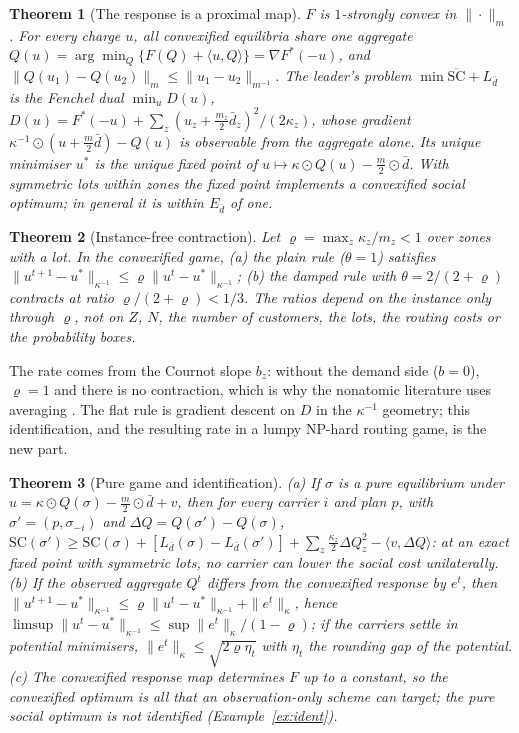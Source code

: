 \documentclass[preprint,11pt]{elsarticle}
\newtheorem{theorem}{Theorem}
\theoremstyle{definition}
\theoremstyle{remark}
\newcommand{\ip}[2]{\langle #1,#2\rangle}
\begin{document}
\begin{theorem}[The response is a proximal map]\label{thm:resolvent}
$F$ is $1$-strongly convex in $\|\cdot\|_m$. For every charge $u$, all convexified equilibria share one aggregate $Q(u)=\arg\min_Q\{F(Q)+\ip uQ\}=\nabla F^*(-u)$, and $\|Q(u_1)-Q(u_2)\|_m\le\|u_1-u_2\|_{m^{-1}}$. The leader's problem $\min\overline{\mathrm{SC}}+L_{\bar d}$ is the Fenchel dual $\min_uD(u)$, $D(u)=F^*(-u)+\sum_z(u_z+\tfrac{m_z}{2}\bar d_z)^2/(2\kappa_z)$, whose gradient $\kappa^{-1}\odot(u+\tfrac m2\bar d)-Q(u)$ is observable from the aggregate alone. Its unique minimiser $u^*$ is the unique fixed point of $u\mapsto\kappa\odot Q(u)-\tfrac m2\odot\bar d$. With symmetric lots within zones the fixed point implements a convexified social optimum; in general it is within $E_{\bar d}$ of one.
\end{theorem}

\begin{theorem}[Instance-free contraction]\label{thm:rate}
Let $\varrho=\max_z\kappa_z/m_z<1$ over zones with a lot. In the convexified game, (a) the plain rule ($\theta=1$) satisfies $\|u^{t+1}-u^*\|_{\kappa^{-1}}\le\varrho\|u^t-u^*\|_{\kappa^{-1}}$; (b) the damped rule with $\theta=2/(2+\varrho)$ contracts at ratio $\varrho/(2+\varrho)<1/3$. The ratios depend on the instance only through $\varrho$, not on $Z$, $N$, the number of customers, the lots, the routing costs or the probability boxes.
\end{theorem}
The rate comes from the Cournot slope $b_z$: without the demand side ($b=0$), $\varrho=1$ and there is no contraction, which is why the nonatomic literature uses averaging \citep{Yang2004}. The flat rule is gradient descent on $D$ in the $\kappa^{-1}$ geometry; this identification, and the resulting rate in a lumpy NP-hard routing game, is the new part.

\begin{theorem}[Pure game and identification]\label{thm:pure}
(a) If $\sigma$ is a pure equilibrium under $u=\kappa\odot Q(\sigma)-\tfrac m2\odot\bar d+v$, then for every carrier $i$ and plan $p$, with $\sigma'=(p,\sigma_{-i})$ and $\Delta Q=Q(\sigma')-Q(\sigma)$, $\mathrm{SC}(\sigma')\ge\mathrm{SC}(\sigma)+[L_{\bar d}(\sigma)-L_{\bar d}(\sigma')]+\sum_z\tfrac{\kappa_z}{2}\Delta Q_z^2-\ip v{\Delta Q}$: at an exact fixed point with symmetric lots, no carrier can lower the social cost unilaterally. (b) If the observed aggregate $Q^t$ differs from the convexified response by $e^t$, then $\|u^{t+1}-u^*\|_{\kappa^{-1}}\le\varrho\|u^t-u^*\|_{\kappa^{-1}}+\|e^t\|_\kappa$, hence $\limsup\|u^t-u^*\|_{\kappa^{-1}}\le\sup\|e^t\|_\kappa/(1-\varrho)$; if the carriers settle in potential minimisers, $\|e^t\|_\kappa\le\sqrt{2\varrho\eta_t}$ with $\eta_t$ the rounding gap of the potential. (c) The convexified response map determines $F$ up to a constant, so the convexified optimum is all that an observation-only scheme can target; the pure social optimum is not identified (Example~\ref{ex:ident}).
\end{theorem}
\end{document}
